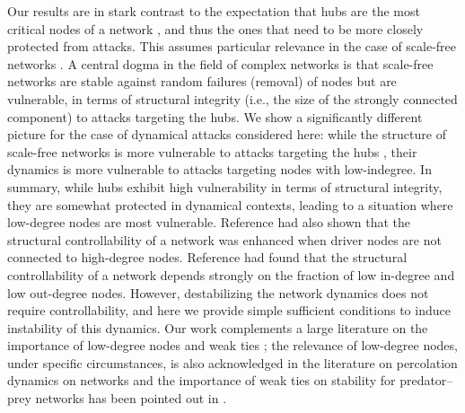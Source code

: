 \documentclass[%
 reprint,
 amsmath,amssymb,
 aip,
]{revtex4-2}
\theoremstyle{italichead}
\theoremstyle{definition}
\begin{document}
{ 
 Our results are in stark contrast to the expectation that hubs are the most critical nodes of a network \cite{artime2024robustness}, and thus the ones that need to be more closely protected from attacks. 
 {This assumes particular relevance in the case of scale-free networks \cite{barabasi1999emergence}.
 A central dogma in the field of complex networks is that scale-free networks are stable against random failures (removal) of nodes but are vulnerable, in terms of structural integrity (i.e., the size of the strongly connected component) to attacks targeting the hubs. %
We show a significantly different picture for the case of dynamical attacks considered here: while the structure of scale-free networks is more vulnerable to attacks targeting the hubs \cite{artime2024robustness}, their dynamics is more vulnerable to attacks targeting nodes with low-indegree.
In summary, while hubs exhibit high vulnerability in terms of structural integrity, they are somewhat protected in dynamical contexts, leading to a situation where low-degree nodes are most vulnerable. Reference \cite{liu2011controllability} had also shown that the structural controllability of a network was enhanced when driver nodes are not connected to high-degree nodes. {Reference  \cite{menichetti2014network} had found that the structural controllability of a network depends strongly on the fraction of
low in-degree and low out-degree nodes. } However, destabilizing the network dynamics does not require controllability, and here we provide simple sufficient conditions to induce instability of this dynamics. Our work complements a large literature on the importance of low-degree nodes and weak ties \cite{granovetter1973strength}; the relevance of low-degree nodes, under specific circumstances, is also acknowledged in the literature on percolation dynamics on networks  \cite{artime2024robustness} and {the importance of weak ties on stability for predator–prey networks has been pointed out in \cite{allesina2012stability}.} 
 }


}
\end{document}
